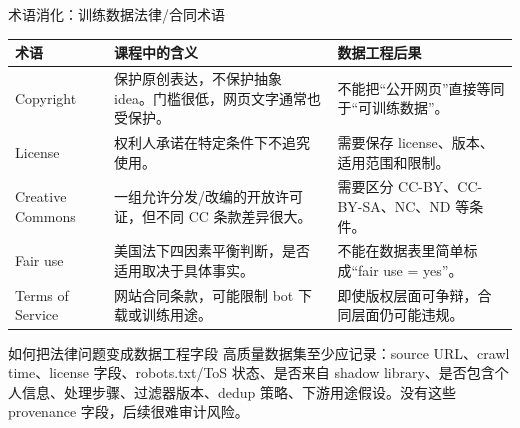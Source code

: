 \begin{knowledgebox}{术语消化：训练数据法律/合同术语}
\begin{tabular}{L{0.2\textwidth}L{0.36\textwidth}L{0.34\textwidth}}
\toprule
术语 & 课程中的含义 & 数据工程后果 \\
\midrule
Copyright & 保护原创表达，不保护抽象 idea。门槛很低，网页文字通常也受保护。 & 不能把“公开网页”直接等同于“可训练数据”。 \\
License & 权利人承诺在特定条件下不追究使用。 & 需要保存 license、版本、适用范围和限制。 \\
Creative Commons & 一组允许分发/改编的开放许可证，但不同 CC 条款差异很大。 & 需要区分 CC-BY、CC-BY-SA、NC、ND 等条件。 \\
Fair use & 美国法下四因素平衡判断，是否适用取决于具体事实。 & 不能在数据表里简单标成“fair use = yes”。 \\
Terms of Service & 网站合同条款，可能限制 bot 下载或训练用途。 & 即使版权层面可争辩，合同层面仍可能违规。 \\
\bottomrule
\end{tabular}
\end{knowledgebox}

\begin{importantbox}{如何把法律问题变成数据工程字段}
高质量数据集至少应记录：source URL、crawl time、license 字段、robots.txt/ToS 状态、是否来自 shadow library、是否包含个人信息、处理步骤、过滤器版本、dedup 策略、下游用途假设。没有这些 provenance 字段，后续很难审计风险。
\end{importantbox}

